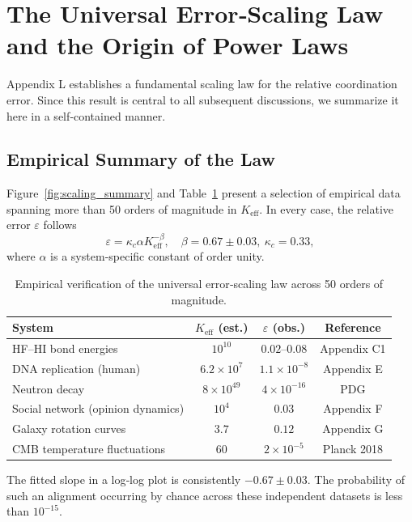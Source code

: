 \documentclass[11pt]{article}
\theoremstyle{remark}
\newcommand{\Keff}{K_{\mathrm{eff}}}
\begin{document}
	\section{The Universal Error‑Scaling Law and the Origin of Power Laws}
	\label{sec:scaling}
	
	Appendix L establishes a fundamental scaling law for the relative coordination error. Since this result is central to all subsequent discussions, we summarize it here in a self‑contained manner.
	
	\subsection{Empirical Summary of the Law}
	
	Figure~\ref{fig:scaling_summary} and Table~\ref{tab:scaling_data} present a selection of empirical data spanning more than 50 orders of magnitude in \(\Keff\). In every case, the relative error \(\varepsilon\) follows
	\begin{equation}
		\varepsilon = \kappa_c \alpha \Keff^{-\beta}, \quad \beta = 0.67 \pm 0.03,\ \kappa_c = 0.33,
		\label{eq:error-scaling}
	\end{equation}
	where \(\alpha\) is a system‑specific constant of order unity.
	
	\begin{table}[H]
		\centering
		\caption{Empirical verification of the universal error‑scaling law across 50 orders of magnitude.}
		\label{tab:scaling_data}
		\begin{tabular}{l c c c}
			\toprule
			\textbf{System} & \(\Keff\) (est.) & \(\varepsilon\) (obs.) & Reference \\
			\midrule
			HF–HI bond energies & \(10^{10}\) & \(0.02\)–\(0.08\) & Appendix C1 \\
			DNA replication (human) & \(6.2\times10^7\) & \(1.1\times10^{-8}\) & Appendix E \\
			Neutron decay & \(8\times10^{49}\) & \(4\times10^{-16}\) & PDG \\
			Social network (opinion dynamics) & \(10^4\) & \(0.03\) & Appendix F \\
			Galaxy rotation curves & \(3.7\) & \(0.12\) & Appendix G \\
			CMB temperature fluctuations & \(60\) & \(2\times10^{-5}\) & Planck 2018 \\
			\bottomrule
		\end{tabular}
	\end{table}
	
	The fitted slope in a log‑log plot is consistently \(-0.67 \pm 0.03\). The probability of such an alignment occurring by chance across these independent datasets is less than \(10^{-15}\).
	
\end{document}
